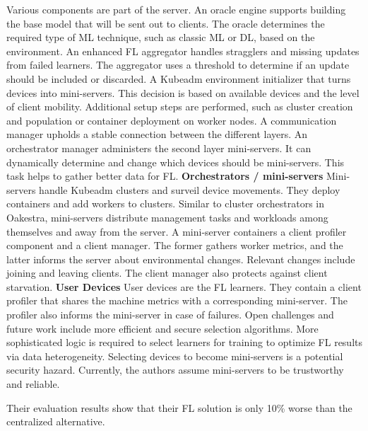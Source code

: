 Various components are part of the server.
An oracle engine supports building the base model that will be sent out to clients.
The oracle determines the required type of ML technique, such as classic ML or DL, based on the environment.
An enhanced FL aggregator handles stragglers and missing updates from failed learners.
The aggregator uses a threshold to determine if an update should be included or discarded.
A Kubeadm environment initializer that turns devices into mini-servers.
This decision is based on available devices and the level of client mobility.
Additional setup steps are performed, such as cluster creation and population or container deployment on worker nodes.
A communication manager upholds a stable connection between the different layers.
An orchestrator manager administers the second layer mini-servers.
It can dynamically determine and change which devices should be mini-servers.
This task helps to gather better data for FL.
\vspace{5mm}
\newline
\textbf{Orchestrators / mini-servers}\newline
Mini-servers handle Kubeadm clusters and surveil device movements.
They deploy containers and add workers to clusters.
Similar to cluster orchestrators in Oakestra, mini-servers distribute management tasks and workloads among themselves and away from the server.
A mini-server containers a client profiler component and a client manager.
The former gathers worker metrics, and the latter informs the server about environmental changes.
Relevant changes include joining and leaving clients.
The client manager also protects against client starvation.
\vspace{5mm}
\newline
\textbf{User Devices}\newline
User devices are the FL learners.
They contain a client profiler that shares the machine metrics with a corresponding mini-server.
The profiler also informs the mini-server in case of failures.
\vspace{5mm}
\newline
Open challenges and future work include more efficient and secure selection algorithms.
More sophisticated logic is required to select learners for training to optimize FL results via data heterogeneity.
Selecting devices to become mini-servers is a potential security hazard.
Currently, the authors assume mini-servers to be trustworthy and reliable.

Their evaluation results show that their FL solution is only 10\% worse than the centralized alternative.

